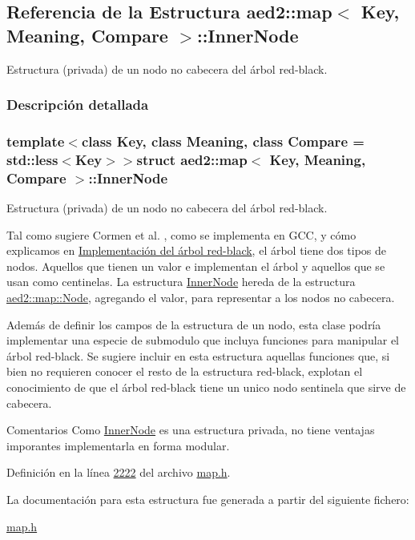 \hypertarget{structaed2_1_1map_1_1InnerNode}{\subsection{\-Referencia de la \-Estructura aed2\-:\-:map$<$ \-Key, \-Meaning, \-Compare $>$\-:\-:\-Inner\-Node}
\label{structaed2_1_1map_1_1InnerNode}
}


\-Estructura (privada) de un nodo no cabecera del árbol red-\/black.  




\subsubsection{\-Descripción detallada}
\subsubsection*{template$<$class \-Key, class \-Meaning, class \-Compare = std\-::less$<$\-Key$>$$>$struct aed2\-::map$<$ Key, Meaning, Compare $>$\-::\-Inner\-Node}

\-Estructura (privada) de un nodo no cabecera del árbol red-\/black. 

\-Tal como sugiere \-Cormen et al. \cite{CormenLeisersonRivestStein2009}, como se implementa en \-G\-C\-C, y cómo explicamos en \hyperlink{Implementacion}{\-Implementación del árbol red-\/black}, el árbol tiene dos tipos de nodos. \-Aquellos que tienen un valor e implementan el árbol y aquellos que se usan como centinelas. \-La estructura \hyperlink{structaed2_1_1map_1_1InnerNode}{\-Inner\-Node} hereda de la estructura \hyperlink{structaed2_1_1map_1_1Node}{aed2\-::map\-::\-Node}, agregando el valor, para representar a los nodos no cabecera.

\-Además de definir los campos de la estructura de un nodo, esta clase podría implementar una especie de submodulo que incluya funciones para manipular el árbol red-\/black. \-Se sugiere incluir en esta estructura aquellas funciones que, si bien no requieren conocer el resto de la estructura red-\/black, explotan el conocimiento de que el árbol red-\/black tiene un unico nodo sentinela que sirve de cabecera.

\begin{DoxyRemark}{\-Comentarios}
\-Como \hyperlink{structaed2_1_1map_1_1InnerNode}{\-Inner\-Node} es una estructura privada, no tiene ventajas imporantes implementarla en forma modular. 
\end{DoxyRemark}


\-Definición en la línea \hyperlink{map_8h_source_l02222}{2222} del archivo \hyperlink{map_8h_source}{map.\-h}.



\-La documentación para esta estructura fue generada a partir del siguiente fichero\-:\begin{DoxyCompactItemize}
\item 
\hyperlink{map_8h}{map.\-h}\end{DoxyCompactItemize}
